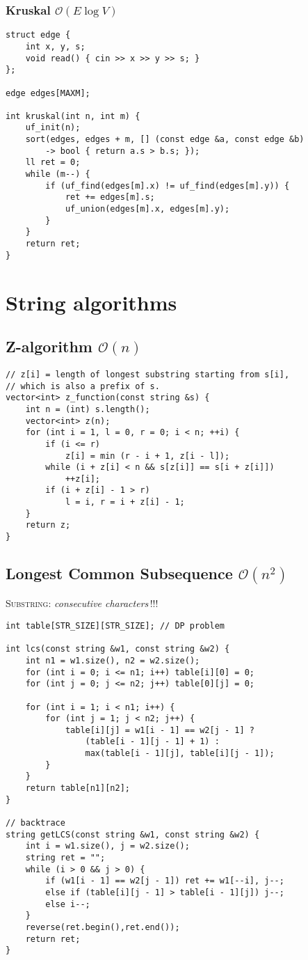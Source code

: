 \documentclass{article}
\begin{document}
\subsubsection{Kruskal $\mathcal{O}(E \log V)$}

\begin{lstlisting}
struct edge {
	int x, y, s;
	void read() { cin >> x >> y >> s; }
};

edge edges[MAXM];

int kruskal(int n, int m) {
	uf_init(n);
	sort(edges, edges + m, [] (const edge &a, const edge &b)
		-> bool { return a.s > b.s; });
	ll ret = 0;
	while (m--) {
		if (uf_find(edges[m].x) != uf_find(edges[m].y)) {
			ret += edges[m].s;
			uf_union(edges[m].x, edges[m].y);
		}
	}
	return ret;
}

\end{lstlisting}

\section{String algorithms}
\subsection{Z-algorithm $\mathcal{O}(n)$}

\begin{lstlisting}
// z[i] = length of longest substring starting from s[i],
// which is also a prefix of s.
vector<int> z_function(const string &s) {
	int n = (int) s.length();
	vector<int> z(n);
	for (int i = 1, l = 0, r = 0; i < n; ++i) {
		if (i <= r)
			z[i] = min (r - i + 1, z[i - l]);
		while (i + z[i] < n && s[z[i]] == s[i + z[i]])
			++z[i];
		if (i + z[i] - 1 > r)
			l = i, r = i + z[i] - 1;
	}
	return z;
}
\end{lstlisting}

\subsection{Longest Common Subsequence $\mathcal{O}(n^{2})$}
\textsc{Substring}: \textit{consecutive characters}\,!!!

\begin{lstlisting}
int table[STR_SIZE][STR_SIZE]; // DP problem

int lcs(const string &w1, const string &w2) {
	int n1 = w1.size(), n2 = w2.size();
	for (int i = 0; i <= n1; i++) table[i][0] = 0;
	for (int j = 0; j <= n2; j++) table[0][j] = 0;
	
	for (int i = 1; i < n1; i++) {
		for (int j = 1; j < n2; j++) {
			table[i][j] = w1[i - 1] == w2[j - 1] ? 
				(table[i - 1][j - 1] + 1) :
				max(table[i - 1][j], table[i][j - 1]);
		}
	}
	return table[n1][n2];
}

// backtrace
string getLCS(const string &w1, const string &w2) {
	int i = w1.size(), j = w2.size();
	string ret = "";
	while (i > 0 && j > 0) {
		if (w1[i - 1] == w2[j - 1]) ret += w1[--i], j--;
		else if (table[i][j - 1] > table[i - 1][j]) j--;
		else i--;
	}
	reverse(ret.begin(),ret.end());
	return ret;
}
\end{lstlisting}
\end{document}
